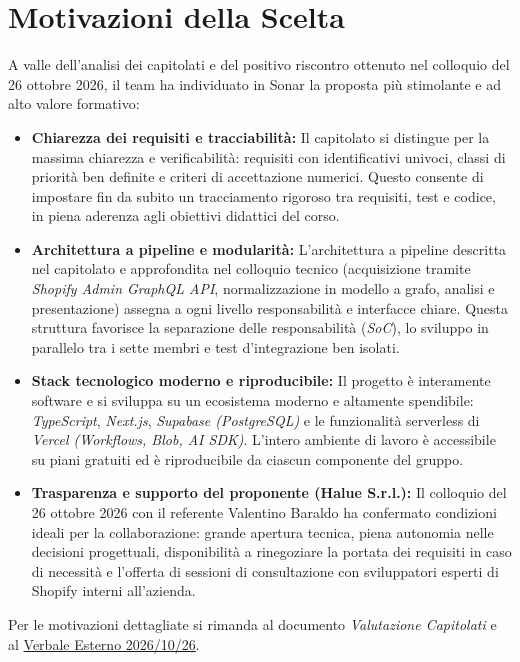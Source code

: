 \section*{Motivazioni della Scelta}
A valle dell'analisi dei capitolati e del positivo riscontro ottenuto nel colloquio del 26 ottobre 2026, il team ha individuato in Sonar la proposta pi\`u stimolante e ad alto valore formativo:
\begin{itemize}
    \item \textbf{Chiarezza dei requisiti e tracciabilit\`a:} Il capitolato si distingue per la massima chiarezza e verificabilit\`a: requisiti con identificativi univoci, classi di priorit\`a ben definite e criteri di accettazione numerici. Questo consente di impostare fin da subito un tracciamento rigoroso tra requisiti, test e codice, in piena aderenza agli obiettivi didattici del corso.
    
    \item \textbf{Architettura a pipeline e modularit\`a:} L'architettura a pipeline descritta nel capitolato e approfondita nel colloquio tecnico (acquisizione tramite \textit{Shopify Admin GraphQL API}, normalizzazione in modello a grafo, analisi e presentazione) assegna a ogni livello responsabilit\`a e interfacce chiare. Questa struttura favorisce la separazione delle responsabilit\`a (\textit{SoC}), lo sviluppo in parallelo tra i sette membri e test d'integrazione ben isolati.
    
    \item \textbf{Stack tecnologico moderno e riproducibile:} Il progetto \`e interamente software e si sviluppa su un ecosistema moderno e altamente spendibile: \textit{TypeScript}, \textit{Next.js}, \textit{Supabase (PostgreSQL)} e le funzionalit\`a serverless di \textit{Vercel (Workflows, Blob, AI SDK)}. L'intero ambiente di lavoro \`e accessibile su piani gratuiti ed \`e riproducibile da ciascun componente del gruppo.
    
    \item \textbf{Trasparenza e supporto del proponente (Halue S.r.l.):} Il colloquio del 26 ottobre 2026 con il referente Valentino Baraldo ha confermato condizioni ideali per la collaborazione: grande apertura tecnica, piena autonomia nelle decisioni progettuali, disponibilit\`a a rinegoziare la portata dei requisiti in caso di necessit\`a e l'offerta di sessioni di consultazione con sviluppatori esperti di Shopify interni all'azienda.
\end{itemize}
\vspace{0.2cm}
\noindent
Per le motivazioni dettagliate si rimanda al documento \textit{Valutazione Capitolati} e al \href{https://githappens-team.github.io/content/verbali/esterni/2026-10-26/2026-10-26.pdf}{Verbale Esterno 2026/10/26}.
\vspace{0.4cm}
